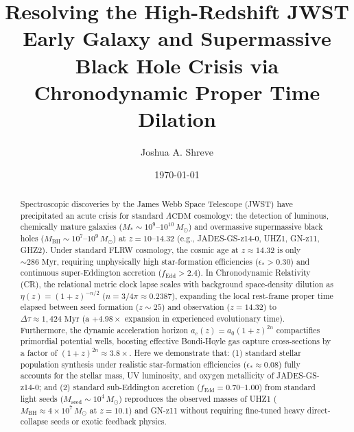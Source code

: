 \documentclass[aps,prd,reprint,superscriptaddress,nofootinbib,floatfix,amsmath,amssymb]{revtex4-2}
\begin{document}
\title{Resolving the High-Redshift JWST Early Galaxy and Supermassive Black Hole Crisis via Chronodynamic Proper Time Dilation}

\author{Joshua A. Shreve}

\date{\today}

\begin{abstract}
Spectroscopic discoveries by the James Webb Space Telescope (JWST) have precipitated an acute crisis for standard $\Lambda\text{CDM}$ cosmology: the detection of luminous, chemically mature galaxies ($M_* \sim 10^9\text{--}10^{10}\,M_\odot$) and overmassive supermassive black holes ($M_{\text{BH}} \sim 10^7\text{--}10^9\,M_\odot$) at $z = 10\text{--}14.32$ (e.g., JADES-GS-z14-0, UHZ1, GN-z11, GHZ2). Under standard FLRW cosmology, the cosmic age at $z \approx 14.32$ is only $\sim 286\text{ Myr}$, requiring unphysically high star-formation efficiencies ($\epsilon_* > 0.30$) and continuous super-Eddington accretion ($f_{\text{Edd}} > 2.4$). In Chronodynamic Relativity (CR), the relational metric clock lapse scales with background space-density dilution as $\eta(z) = (1+z)^{-n/2}$ ($n = 3/4\pi \approx 0.2387$), expanding the local rest-frame proper time elapsed between seed formation ($z \sim 25$) and observation ($z = 14.32$) to $\Delta\tau \approx 1,424\text{ Myr}$ (a $+4.98\times$ expansion in experienced evolutionary time). Furthermore, the dynamic acceleration horizon $a_c(z) = a_0(1+z)^{2n}$ compactifies primordial potential wells, boosting effective Bondi-Hoyle gas capture cross-sections by a factor of $(1+z)^{2n} \approx 3.8\times$. Here we demonstrate that: (1) standard stellar population synthesis under realistic star-formation efficiencies ($\epsilon_* \approx 0.08$) fully accounts for the stellar mass, UV luminosity, and oxygen metallicity of JADES-GS-z14-0; and (2) standard sub-Eddington accretion ($f_{\text{Edd}} = 0.70\text{--}1.00$) from standard light seeds ($M_{\text{seed}} \sim 10^4\,M_\odot$) reproduces the observed masses of UHZ1 ($M_{\text{BH}} \approx 4 \times 10^7\,M_\odot$ at $z=10.1$) and GN-z11 without requiring fine-tuned heavy direct-collapse seeds or exotic feedback physics.
\end{abstract}


\maketitle
\end{document}
